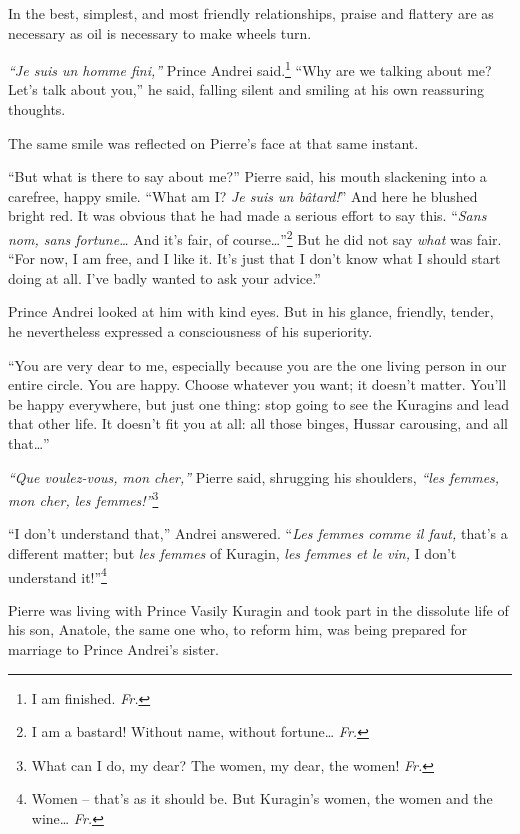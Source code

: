 In the best, simplest, and most friendly relationships, praise and flattery are as necessary as oil is necessary to make wheels turn.

\textit{``Je suis un homme fini,''} Prince Andrei said.\footnote{I am finished. \textit{Fr.}} ``Why are we talking about me? Let's talk about you,'' he said, falling silent and smiling at his own reassuring thoughts. %

The same smile was reflected on Pierre's face at that same instant.

``But what is there to say about me?'' Pierre said, his mouth slackening into a carefree, happy smile. ``What am I? \textit{Je suis un b\^atard!}'' And here he blushed bright red. It was obvious that he had made a serious effort to say this. ``\textit{Sans nom, sans fortune\ldots{}} And it's fair, of course\ldots{}''\footnote{I am a bastard! Without name, without fortune\ldots{} \textit{Fr.}} But he did not say \emph{what} was fair. ``For now, I am free, and I like it. It's just that I don't know what I should start doing at all. I've badly wanted to ask your advice.'' %

Prince Andrei looked at him with kind eyes. But in his glance, friendly, tender, he nevertheless expressed a consciousness of his superiority.

``You are very dear to me, especially because you are the one living person in our entire circle. You are happy. Choose whatever you want; it doesn't matter. You'll be happy everywhere, but just one thing: stop going to see the Kuragins and lead that other life. It doesn't fit you at all: all those binges, Hussar carousing, and all that\ldots{}'' %

\textit{``Que voulez-vous, mon cher,''} Pierre said, shrugging his shoulders, \textit{``les femmes, mon cher, les femmes!''}\footnote{What can I do, my dear? The women, my dear, the women! \textit{Fr.}} %

``I don't understand that,'' Andrei answered. ``\textit{Les femmes comme il faut,} that's a different matter; but \textit{les femmes} of Kuragin, \textit{les femmes et le vin,} I don't understand it!''\footnote{Women -- that's as it should be. But Kuragin's women, the women and the wine\ldots{} \textit{Fr.}} %

Pierre was living with Prince Vasily Kuragin and took part in the dissolute life of his son, Anatole, the same one who, to reform him, was being prepared for marriage to Prince Andrei's sister.

